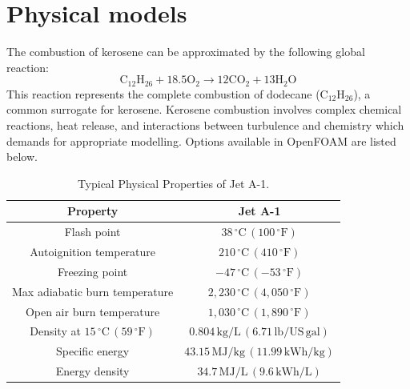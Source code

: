 \documentclass[12pt]{article}
\begin{document}
\section{Physical models}
The combustion of kerosene can be approximated by the following global reaction:
%
\begin{equation}
    \text{C}_{12}\text{H}_{26} + 18.5\text{O}_2 \rightarrow 12\text{CO}_2 + 13\text{H}_2\text{O}
\end{equation}
%
This reaction represents the complete combustion of dodecane ($\text{C}_{12}\text{H}_{26}$), a common surrogate for kerosene. {Kerosene combustion} involves complex chemical reactions, heat release, and interactions between turbulence and chemistry which demands for appropriate modelling. Options available in OpenFOAM are listed below.
%
%    
%    
%
\begin{table}[H]
\centering
\caption{Typical Physical Properties of Jet A-1.}
\label{tab:jet-fuel-properties}
\begin{tabular}{cc}
\toprule
\textbf{Property} & \textbf{Jet A-1} \\
\midrule
Flash point & $38\,^\circ\mathrm{C}\,(100\,^\circ\mathrm{F})$ \\
Autoignition temperature & $210\,^\circ\mathrm{C}\,(410\,^\circ\mathrm{F})$ \\
Freezing point & $-47\,^\circ\mathrm{C}\,(-53\,^\circ\mathrm{F})$ \\
Max adiabatic burn temperature & $2,230\,^\circ\mathrm{C}\,(4,050\,^\circ\mathrm{F})$ \\
Open air burn temperature & $1,030\,^\circ\mathrm{C}\,(1,890\,^\circ\mathrm{F})$\\
Density at $15\,^\circ\mathrm{C}\,(59\,^\circ\mathrm{F})$ & $0.804\,\mathrm{kg/L}\,(6.71\,\mathrm{lb/US\,gal})$ \\
Specific energy & $43.15\,\mathrm{MJ/kg}\,(11.99\,\mathrm{kWh/kg})$  \\
Energy density & $34.7\,\mathrm{MJ/L}\,(9.6\,\mathrm{kWh/L})$ \\
\bottomrule
\end{tabular}
\end{table}
\end{document}
